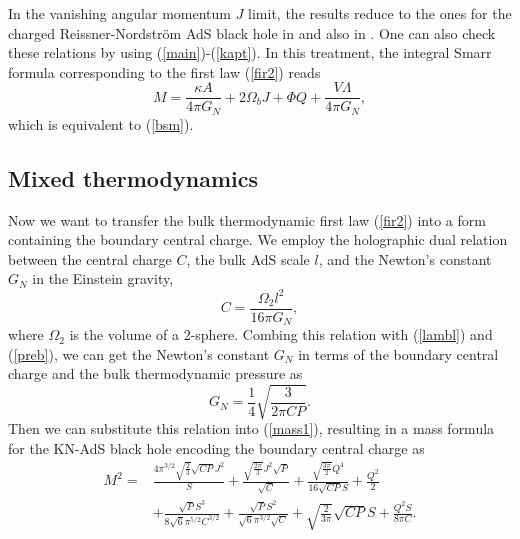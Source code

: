 \documentclass[a4paper,11pt]{article}
\newcommand{\eq}[1]{(\ref{#1})}
\begin{document}
In the vanishing angular momentum $J$ limit, the results reduce to the ones for the charged Reissner-Nordström AdS black hole in \cite{Cong:2021jgb} and also in \cite{Zhang:2023uay}. One can also check these relations by using \eq{main}-\eq{kapt}. In this treatment, the  integral Smarr formula corresponding to the first law \eq{fir2} reads
\begin{equation}
M=\frac{\kappa A}{4 \pi G_N}+2\Omega_b J+\Phi Q+\frac{V \Lambda}{4 \pi G_N},
\end{equation}
which is equivalent to \eq{bsm}. 





\subsection{Mixed thermodynamics}
Now we want to transfer the bulk thermodynamic first law \eq{fir2} into a form containing the boundary central charge. We employ the holographic dual relation between the central charge $C$, the bulk AdS scale $l$, and the Newton's constant $G_N$ in the Einstein gravity,
\begin{equation}\label{cogn}
C=\frac{\Omega_{2} l^{2}}{16 \pi G_N},
\end{equation}
where $\Omega_2$ is the volume of a 2-sphere. Combing this relation with  \eq{lambl} and \eq{preb}, we can get the Newton's constant $G_N$ in terms of the boundary central charge and the bulk thermodynamic pressure as
\begin{equation}
G_N=\frac{1}{4} \sqrt{\frac{3}{2 \pi  C P}}.
\end{equation}
Then we can substitute this relation into \eq{mass1}, resulting in a mass formula for the KN-AdS black hole encoding the  boundary central charge as
\begin{equation}\label{mass2}
\begin{aligned}
M^2=&\frac{4 \pi ^{3/2} \sqrt{\frac{2}{3}} \sqrt{CP} J^2 }{S}+\frac{\sqrt{\frac{2 \pi }{3}} J^2 \sqrt{P}}{\sqrt{C}}+\frac{\sqrt{\frac{3 \pi }{2}} Q^4}{16 \sqrt{CP}  S}+\frac{Q^2}{2}\\&+\frac{\sqrt{P} S^3}{8 \sqrt{6} \pi ^{5/2} C^{3/2}}+\frac{\sqrt{P} S^2}{\sqrt{6} \pi ^{3/2} \sqrt{C}}+\sqrt{\frac{2}{3 \pi }} \sqrt{CP}  S+\frac{Q^2 S}{8 \pi  C}.
\end{aligned}
\end{equation}
\end{document}
